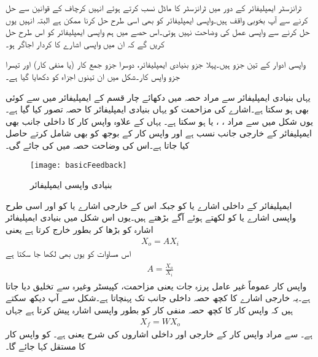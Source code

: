 
ٹرانزسٹر ایمپلیفائر کے دور میں ٹرانزسٹر کا ماڈل نسب کرتے ہوئے انہیں کرچاف کے قوانین سے حل کرنے سے آپ بخوبی واقف ہیں۔واپسی ایمپلیفائر کو بھی اسی طرح حل کرنا ممکن ہے البتہ انہیں یوں حل کرنے سے واپسی عمل کی وضاحت نہیں ہوتی۔اس حصے میں ہم واپسی ایمپلیفائر کو اس طرح حل کریں گے کہ ان میں واپسی اشارے کا کردار اجاگر ہو۔

واپسی ادوار کے تین جزو ہیں۔پہلا جزو بنیادی ایمپلیفائر، دوسرا جزو جمع کار (یا منفی کار) اور تیسرا جزو واپس کار۔شکل  میں ان تینوں اجزاء کو دکھایا گیا ہے۔

یہاں بنیادی ایمپلیفائر سے مراد حصہ  میں دکھائے چار قسم کے ایمپلیفائر میں سے کوئی بھی ہو سکتا ہے۔اشارے کی مزاحمت  کو یہاں بنیادی ایمپلیفائر کا حصہ تصور کیا گیا ہے۔ یوں شکل  میں  سے مراد  ،  ،  یا  ہو سکتا ہے۔ یہاں  کے علاوہ واپس کار کا داخلی جانب  بھی ایمپلیفائر کے خارجی جانب نسب ہے  اور  واپس کار کے بوجھ کو بھی شامل کرتے حاصل کیا جاتا ہے۔اس کی وضاحت حصہ  میں کی جائے گی۔
\begin{figure}
\centering
\texttt{[image: basicFeedback]}
\caption{بنیادی واپسی ایمپلیفائر}
\label{شکل_بنیادی_واپسی_ایمپلیفائر}
\end{figure}
ایمپلیفائر کے داخلی اشارے  یا  کو  جبکہ اس کے خارجی اشارے  یا  کو   اور اسی طرح واپسی اشارے  یا  کو  لکھتے ہوئے آگے بڑھتے ہیں۔یوں اس شکل میں بنیادی ایمپلیفائر اشارہ  کو بڑھا کر بطور  خارج کرتا ہے یعنی
\begin{align}
X_o = A X_i
\end{align}
 اس مساوات کو یوں بھی لکھا جا سکتا ہے
\begin{gather} \label{مساوات_واپسی_افزائش}
\begin{aligned}
A =\frac{X_o}{X_i}
\end{aligned}
\end{gather}
واپس کار عموماً غیر عامل پرزہ جات یعنی مزاحمت، کپیسٹر وغیرہ سے تخلیق دیا جاتا ہے۔یہ  خارجی اشارے کا کچھ حصہ داخلی جانب تک پہنچاتا ہے۔شکل سے آپ دیکھ سکتے ہیں کہ واپس کار   کا کچھ حصہ منفی کار کو بطور واپسی اشارہ   پیش کرتا ہے جہاں
\begin{align} \label{مساوات_واپسی_واپسی_اشارہ}
X_f = W X_o
\end{align}
ہے۔ سے مراد واپس کار کے خارجی اور داخلی اشاروں کی شرح یعنی  ہے۔ کو واپس کار کا مستقل کہا جائے گا۔

